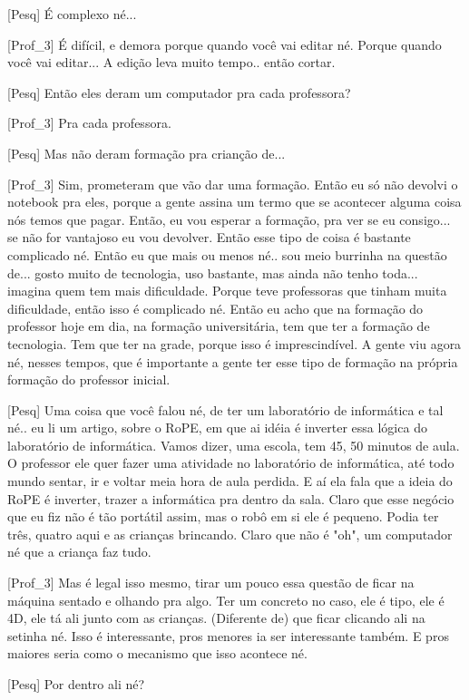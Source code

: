 [Pesq] É complexo né...

[Prof\_3] É difícil, e demora porque quando você vai editar né. Porque quando você vai editar... A edição leva muito tempo.. então cortar.

[Pesq] Então eles deram um computador pra cada professora?

[Prof\_3] Pra cada professora.

[Pesq] Mas não deram formação pra crianção de...

[Prof\_3] Sim, prometeram que vão dar uma formação. Então eu só não devolvi o notebook pra eles, porque a gente assina um termo que se acontecer alguma coisa nós temos que pagar. Então, eu vou esperar a formação, pra ver se eu consigo... se não for vantajoso eu vou devolver. Então esse tipo de coisa é bastante complicado né. Então eu que mais ou menos né.. sou meio burrinha na questão de... gosto muito de tecnologia, uso bastante, mas ainda não tenho toda... imagina quem tem mais dificuldade. Porque teve professoras que tinham muita dificuldade, então isso é complicado né. Então eu acho que na formação do professor hoje em dia, na formação universitária, tem que ter a formação de tecnologia. Tem que ter na grade, porque isso é imprescindível. A gente viu agora né, nesses tempos, que é importante a gente ter esse tipo de formação na própria formação do professor inicial. 

[Pesq] Uma coisa que você falou né, de ter um laboratório de informática e tal né.. eu li um artigo, sobre o RoPE, em que ai idéia é inverter essa lógica do laboratório de informática. Vamos dizer, uma escola, tem 45, 50 minutos de aula. O professor ele quer fazer uma atividade no laboratório de informática, até todo mundo sentar, ir e voltar meia hora de aula perdida. E aí ela fala que a ideia do RoPE é inverter, trazer a informática pra dentro da sala. Claro que esse negócio que eu fiz não é tão portátil assim, mas o robô em si ele é pequeno. Podia ter três, quatro aqui e as crianças brincando. Claro que não é "oh", um computador né que a criança faz tudo.

[Prof\_3] Mas é legal isso mesmo, tirar um pouco essa questão de ficar na máquina sentado e olhando pra algo. Ter um concreto no caso, ele é tipo, ele é 4D, ele tá ali junto com as crianças. (Diferente de) que ficar clicando ali na setinha né. Isso é interessante, pros menores ia ser interessante também. E pros maiores seria como o mecanismo que isso acontece né.

[Pesq] Por dentro ali né?

